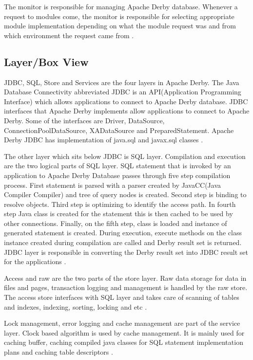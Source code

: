 \documentclass[9pt,twocolumn,twoside]{../../styles/osajnl}
\begin{document}
The monitor is responsible for managing Apache Derby
database. Whenever a request to modules come, the monitor is responsible
for selecting appropriate module implementation depending on what the
module request was and from which environment the request came from
\cite{www-derbyarch}.

\subsection{Layer/Box View} 

JDBC, SQL, Store and Services are the four layers in Apache Derby. The
Java Database Connectivity abbreviated JDBC is an API(Application
Programming Interface) which allows applications to connect to Apache
Derby database. JDBC interfaces that Apache Derby implements allow
applications to connect to Apache Derby. Some of the interfaces are
Driver, DataSource, ConnectionPoolDataSource, XADataSource and
PreparedStatement. Apache Derby JDBC has implementation of java.sql
and javax.sql classes \cite{www-derbyarch}.

The other layer which sits below JDBC is SQL layer. Compilation and
execution are the two logical parts of SQL layer. SQL statement that
is invoked by an application to Apache Derby Database passes through
five step compilation process. First statement is parsed with a parser
created by JavaCC(Java Compiler Compiler) and tree of query nodes is
created. Second step is binding to resolve objects. Third step is
optimizing to identify the access path. In fourth step Java class is
created for the statement this is then cached to be used by other
connections. Finally, on the fifth step, class is loaded and instance
of generated statement is created. During execution, execute methods
on the class instance created during compilation are called and Derby
result set is returned. JDBC layer is responsible in converting the
Derby result set into JDBC result set for the applications
\cite{www-derbyarch}.

Access and raw are the two parts of the store layer. Raw data storage
for data in files and pages, transaction logging and management is
handled by the raw store. The access store interfaces with SQL layer
and takes care of scanning of tables and indexes, indexing, sorting,
locking and etc \cite{www-derbyarch}.

Lock management, error logging and cache management are part of the
service layer. Clock based algorithm is used by cache management. It
is mainly used for caching buffer, caching compiled java classes for
SQL statement implementation plans and caching table descriptors
\cite{www-derbyarch}.
\end{document}
